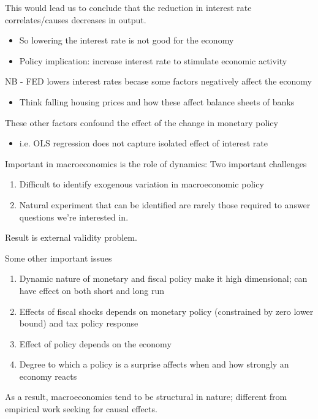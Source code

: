 \documentclass{beamer}
\begin{document}
\begin{frame}
 This would lead us to conclude that the reduction in interest rate correlates/causes decreases in output.
 \begin{itemize}
   \item So lowering the interest rate is not good for the economy
   \item Policy implication: increase interest rate to stimulate economic activity
 \end{itemize}
 NB - FED lowers interest rates becase some factors negatively affect the economy
 \begin{itemize}
   \item Think falling housing prices and how these affect balance sheets of banks
 \end{itemize}
 These other factors confound the effect of the change in monetary policy
 \begin{itemize}
   \item i.e. OLS regression does not capture isolated effect of interest rate
 \end{itemize}
\end{frame}

\begin{frame}
  Important in macroeconomics is the role of dynamics: Two important challenges
  \begin{enumerate}
    \item Difficult to identify exogenous variation in macroeconomic policy
    \item Natural experiment that can be identified are rarely those required to answer questions we're interested in. 
  \end{enumerate}
  \medskip
Result is external validity problem. 
\end{frame}

\begin{frame}
 Some other important issues
 \begin{enumerate}
   \item Dynamic nature of monetary and fiscal policy make it high dimensional; can have effect on both short and long run
   \item Effects of fiscal shocks depends on monetary policy (constrained by zero lower bound) and tax policy response
   \item Effect of policy depends on the economy
   \item Degree to which a policy is a surprise affects when and how strongly an economy reacts  
 \end{enumerate}
 As a result, macroeconomics tend to be structural in nature; different from empirical work seeking for causal effects.
\end{frame}
\end{document}
